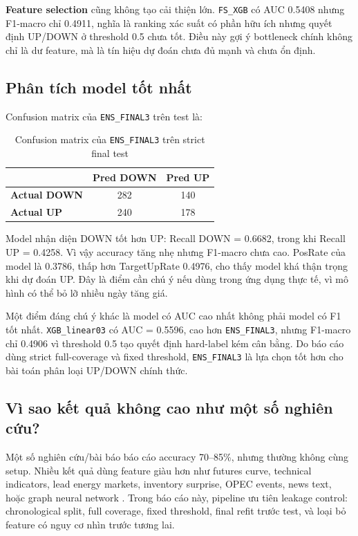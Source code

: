 \documentclass[10pt,a4paper]{article}
\newcommand{\code}[1]{\texttt{#1}}
\begin{document}
\textbf{Feature selection} cũng không tạo cải thiện lớn. \code{FS\_XGB} có AUC 0.5408 nhưng F1-macro chỉ 0.4911, nghĩa là ranking xác suất có phần hữu ích nhưng quyết định UP/DOWN ở threshold 0.5 chưa tốt. Điều này gợi ý bottleneck chính không chỉ là dư feature, mà là tín hiệu dự đoán chưa đủ mạnh và chưa ổn định.

\subsection{Phân tích model tốt nhất}

Confusion matrix của \code{ENS\_FINAL3} trên test là:

\begin{table}[!htbp]
\centering
\caption{Confusion matrix của \code{ENS\_FINAL3} trên strict final test}
\small
\begin{tabular}{lcc}
\toprule
 & \textbf{Pred DOWN} & \textbf{Pred UP} \\
\midrule
\textbf{Actual DOWN} & 282 & 140 \\
\textbf{Actual UP} & 240 & 178 \\
\bottomrule
\end{tabular}
\end{table}

Model nhận diện DOWN tốt hơn UP: Recall DOWN = 0.6682, trong khi Recall UP = 0.4258. Vì vậy accuracy tăng nhẹ nhưng F1-macro chưa cao. PosRate của model là 0.3786, thấp hơn TargetUpRate 0.4976, cho thấy model khá thận trọng khi dự đoán UP. Đây là điểm cần chú ý nếu dùng trong ứng dụng thực tế, vì mô hình có thể bỏ lỡ nhiều ngày tăng giá.

Một điểm đáng chú ý khác là model có AUC cao nhất không phải model có F1 tốt nhất. \code{XGB\_linear03} có AUC = 0.5596, cao hơn \code{ENS\_FINAL3}, nhưng F1-macro chỉ 0.4906 vì threshold 0.5 tạo quyết định hard-label kém cân bằng. Do báo cáo dùng strict full-coverage và fixed threshold, \code{ENS\_FINAL3} là lựa chọn tốt hơn cho bài toán phân loại UP/DOWN chính thức.

\subsection{Vì sao kết quả không cao như một số nghiên cứu?}

Một số nghiên cứu/bài báo báo cáo accuracy 70--85\%, nhưng thường không cùng setup. Nhiều kết quả dùng feature giàu hơn như futures curve, technical indicators, lead energy markets, inventory surprise, OPEC events, news text, hoặc graph neural network \cite{pan2009,foroutan2024,bai2022}. Trong báo cáo này, pipeline ưu tiên leakage control: chronological split, full coverage, fixed threshold, final refit trước test, và loại bỏ feature có nguy cơ nhìn trước tương lai.
\end{document}
